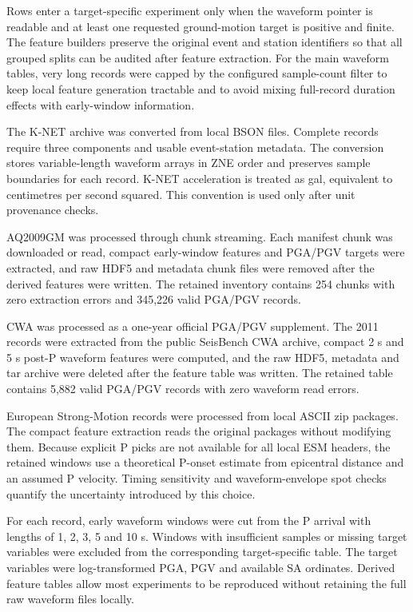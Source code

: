 \documentclass[
  10pt,
]{article}
\begin{document}
Rows enter a target-specific experiment only when the waveform pointer
is readable and at least one requested ground-motion target is positive
and finite. The feature builders preserve the original event and station
identifiers so that all grouped splits can be audited after feature
extraction. For the main waveform tables, very long records were capped
by the configured sample-count filter to keep local feature generation
tractable and to avoid mixing full-record duration effects with
early-window information.

The K-NET archive was converted from local BSON files. Complete records
require three components and usable event-station metadata. The
conversion stores variable-length waveform arrays in ZNE order and
preserves sample boundaries for each record. K-NET acceleration is
treated as gal, equivalent to centimetres per second squared. This
convention is used only after unit provenance checks.

AQ2009GM was processed through chunk streaming. Each manifest chunk was
downloaded or read, compact early-window features and PGA/PGV targets
were extracted, and raw HDF5 and metadata chunk files were removed after
the derived features were written. The retained inventory contains 254
chunks with zero extraction errors and 345,226 valid PGA/PGV records.

CWA was processed as a one-year official PGA/PGV supplement. The 2011
records were extracted from the public SeisBench CWA archive, compact 2
s and 5 s post-P waveform features were computed, and the raw HDF5,
metadata and tar archive were deleted after the feature table was
written. The retained table contains 5,882 valid PGA/PGV records with
zero waveform read errors.

European Strong-Motion records were processed from local ASCII zip
packages. The compact feature extraction reads the original packages
without modifying them. Because explicit P picks are not available for
all local ESM headers, the retained windows use a theoretical P-onset
estimate from epicentral distance and an assumed P velocity. Timing
sensitivity and waveform-envelope spot checks quantify the uncertainty
introduced by this choice.

For each record, early waveform windows were cut from the P arrival with
lengths of 1, 2, 3, 5 and 10 s. Windows with insufficient samples or
missing target variables were excluded from the corresponding
target-specific table. The target variables were log-transformed PGA,
PGV and available SA ordinates. Derived feature tables allow most
experiments to be reproduced without retaining the full raw waveform
files locally.
\end{document}
